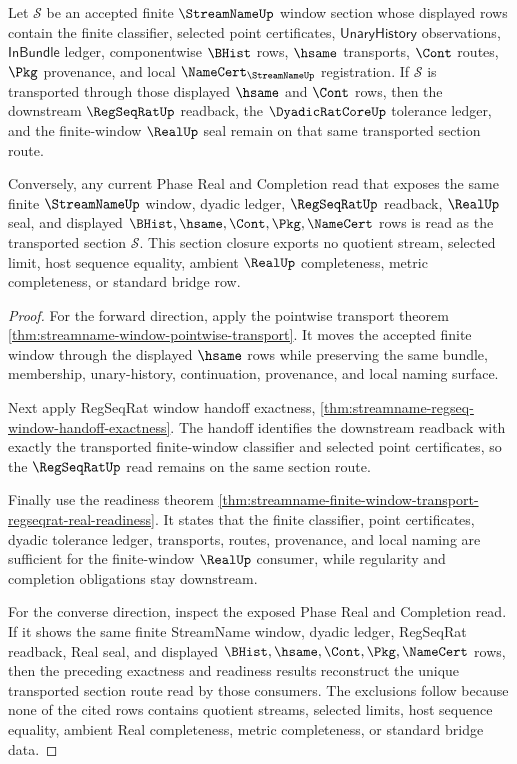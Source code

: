 \begin{theorem}
\label{thm:streamname-finite-window-section-transport-closure}
Let $\mathcal{S}$ be an accepted finite $\StreamNameUp$ window section whose displayed rows contain the finite classifier, selected point certificates, $\mathsf{UnaryHistory}$ observations, $\mathsf{InBundle}$ ledger, componentwise $\BHist$ rows, $\hsame$ transports, $\Cont$ routes, $\Pkg$ provenance, and local $\NameCert_{\StreamNameUp}$ registration. If $\mathcal{S}$ is transported through those displayed $\hsame$ and $\Cont$ rows, then the downstream $\RegSeqRatUp$ readback, the $\DyadicRatCoreUp$ tolerance ledger, and the finite-window $\RealUp$ seal remain on that same transported section route.

Conversely, any current Phase Real and Completion read that exposes the same finite $\StreamNameUp$ window, dyadic ledger, $\RegSeqRatUp$ readback, $\RealUp$ seal, and displayed $\BHist,\hsame,\Cont,\Pkg,\NameCert$ rows is read as the transported section $\mathcal{S}$. This section closure exports no quotient stream, selected limit, host sequence equality, ambient $\RealUp$ completeness, metric completeness, or standard bridge row.
\end{theorem}
\begin{proof}
For the forward direction, apply the pointwise transport theorem \autoref{thm:streamname-window-pointwise-transport}. It moves the accepted finite window through the displayed $\hsame$ rows while preserving the same bundle, membership, unary-history, continuation, provenance, and local naming surface.

Next apply RegSeqRat window handoff exactness, \autoref{thm:streamname-regseq-window-handoff-exactness}. The handoff identifies the downstream readback with exactly the transported finite-window classifier and selected point certificates, so the $\RegSeqRatUp$ read remains on the same section route.

Finally use the readiness theorem \autoref{thm:streamname-finite-window-transport-regseqrat-real-readiness}. It states that the finite classifier, point certificates, dyadic tolerance ledger, transports, routes, provenance, and local naming are sufficient for the finite-window $\RealUp$ consumer, while regularity and completion obligations stay downstream.

For the converse direction, inspect the exposed Phase Real and Completion read. If it shows the same finite StreamName window, dyadic ledger, RegSeqRat readback, Real seal, and displayed $\BHist,\hsame,\Cont,\Pkg,\NameCert$ rows, then the preceding exactness and readiness results reconstruct the unique transported section route read by those consumers. The exclusions follow because none of the cited rows contains quotient streams, selected limits, host sequence equality, ambient Real completeness, metric completeness, or standard bridge data.
\end{proof}

